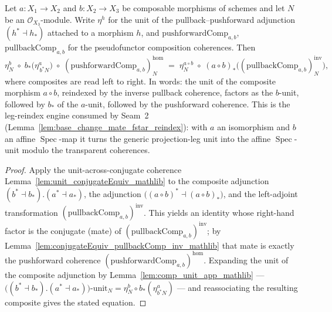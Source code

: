 \begin{lemma}

  \label{lem:pullbackPushforward_unit_comp}
  Let \(a : X_1 \to X_2\) and \(b : X_2 \to X_3\) be composable morphisms of schemes and let
  \(N\) be an \(\mathcal{O}_{X_3}\)-module. Write \(\eta^{h}\) for the unit of the
  pullback--pushforward adjunction \((h^{*}\dashv h_{*})\) attached to a morphism \(h\), and
  \(\mathrm{pushforwardComp}_{a,b}\), \(\mathrm{pullbackComp}_{a,b}\) for the pseudofunctor
  composition coherences. Then
  \[
    \eta^{b}_{N} \;\circ\; b_{*}\bigl(\eta^{a}_{\,b^{*}N}\bigr)
      \;\circ\; (\mathrm{pushforwardComp}_{a,b})^{\mathrm{hom}}_{N}
    \;=\;
    \eta^{a\circ b}_{N} \;\circ\;
      (a\circ b)_{*}\bigl((\mathrm{pullbackComp}_{a,b})^{\mathrm{inv}}_{N}\bigr),
  \]
  where composites are read left to right. In words: the unit of the composite morphism
  \(a \circ b\), reindexed by the inverse pullback coherence, factors as the \(b\)-unit, followed
  by \(b_{*}\) of the \(a\)-unit, followed by the pushforward coherence. This is the leg-reindex
  engine consumed by Seam~2 (Lemma~\ref{lem:base_change_mate_fstar_reindex}): with \(a\) an
  isomorphism and \(b\) an affine \(\operatorname{Spec}\)-map it turns the generic projection-leg
  unit into the affine \(\operatorname{Spec}\)-unit modulo the transparent coherences.
\end{lemma}
\begin{proof}
  Apply the unit-across-conjugate coherence Lemma~\ref{lem:unit_conjugateEquiv_mathlib} to the
  composite adjunction \((b^{*}\dashv b_{*}) . (a^{*}\dashv a_{*})\), the adjunction
  \(\bigl((a\circ b)^{*}\dashv (a\circ b)_{*}\bigr)\), and the left-adjoint transformation
  \((\mathrm{pullbackComp}_{a,b})^{\mathrm{inv}}\). This yields an identity whose right-hand factor
  is the conjugate (mate) of \((\mathrm{pullbackComp}_{a,b})^{\mathrm{inv}}\); by
  Lemma~\ref{lem:conjugateEquiv_pullbackComp_inv_mathlib} that mate is exactly the pushforward
  coherence \((\mathrm{pushforwardComp}_{a,b})^{\mathrm{hom}}\). Expanding the unit of the composite
  adjunction by Lemma~\ref{lem:comp_unit_app_mathlib} —
  \(\bigl((b^{*}\dashv b_{*}).(a^{*}\dashv a_{*})\bigr)\text{-unit}_N
    = \eta^{b}_N \circ b_{*}(\eta^{a}_{b^{*}N})\) — and reassociating the resulting composite gives
  the stated equation.
\end{proof}

